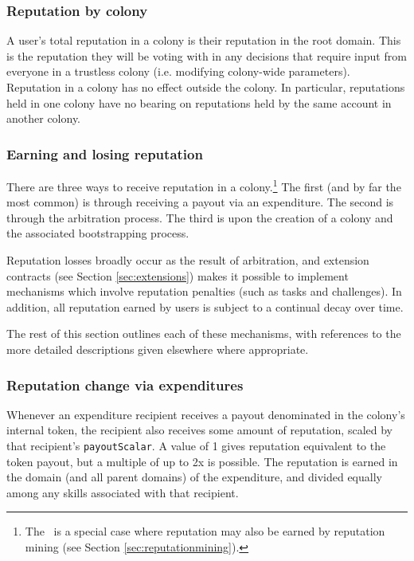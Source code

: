 \subsubsection*{Reputation by colony}\label{sec:rep-by-colony}

A user's total reputation in a colony is their reputation in the root domain. This is the reputation they will be voting with in any decisions that require input from everyone in a trustless colony (i.e. modifying colony-wide parameters). Reputation in a colony has no effect outside the colony. In particular, reputations held in one colony have no bearing on reputations held by the same account in another colony.

\subsubsection{Earning and losing reputation}\label{sec:earning-losing-rep}

There are three ways to receive reputation in a colony.\footnote{The \rc\ is a special case where reputation may also be earned by reputation mining (see Section \ref{sec:reputationmining}).} The first (and by far the most common) is through receiving a payout via an expenditure. The second is through the arbitration process. The third is upon the creation of a colony and the associated bootstrapping process.

Reputation losses broadly occur as the result of arbitration, and extension contracts (see Section \ref{sec:extensions}) makes it possible to implement mechanisms which involve reputation penalties (such as tasks and challenges). In addition, all reputation earned by users is subject to a continual decay over time.

The rest of this section outlines each of these mechanisms, with references to the more detailed descriptions given elsewhere where appropriate.

\subsubsection*{Reputation change via expenditures}

Whenever an expenditure recipient receives a payout denominated in the colony's internal token, the recipient also receives some amount of reputation, scaled by that recipient's \texttt{payoutScalar}. A value of 1 gives reputation equivalent to the token payout, but a multiple of up to 2x is possible. The reputation is earned in the domain (and all parent domains) of the expenditure, and divided equally among any skills associated with that recipient.

